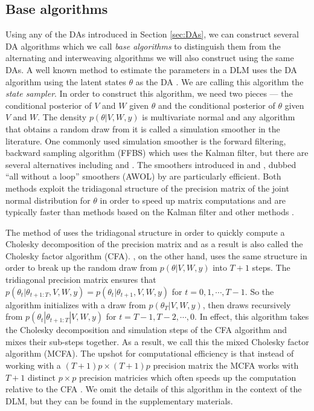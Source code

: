 \documentclass{article}
\begin{document}
\subsection{Base algorithms}\label{sec:Algs:base}
Using any of the DAs introduced in Section \ref{sec:DAs}, we can construct several DA algorithms which we call {\it base algorithms} to distinguish them from the alternating and interweaving algorithms we will also construct using the same DAs. A well known method to estimate the parameters in a DLM uses the DA algorithm using the latent states $\theta$ as the DA \cite{fruhwirth1994data,carter1994gibbs}. We are calling this algorithm the {\it state sampler}. In order to construct this algorithm, we need two pieces --- the conditional posterior of $V$ and $W$ given $\theta$ and the conditional posterior of $\theta$ given $V$ and $W$. The density $p(\theta|V,W,y)$ is multivariate normal and any algorithm that obtains a random draw from it is called a simulation smoother in the literature. One commonly used simulation smoother is the forward filtering, backward sampling algorithm (FFBS) \cite{fruhwirth1994data,carter1994gibbs} which uses the Kalman filter, but there are several alternatives including  and . The smoothers introduced in  and , dubbed ``all without a loop'' smoothers (AWOL) by  are particularly efficient. Both methods exploit the tridiagonal structure of the precision matrix of the joint normal distribution for $\theta$ in order to speed up matrix computations and are typically faster than methods based on the Kalman filter and other methods \cite{mccausland2011simulation}.

The method of  uses the tridiagonal structure in order to quickly compute a Cholesky decomposition of the precision matrix and as a result is also called the Cholesky factor algorithm (CFA). , on the other hand, uses the same structure in order to break up the random draw from $p(\theta|V,W,y)$ into $T+1$ steps. The tridiagonal precision matrix ensures that $p(\theta_{t}|\theta_{t+1:T},V,W,y) = p(\theta_{t}|\theta_{t+1},V,W,y)$ for $t=0,1,\cdots,T-1$. So the algorithm initializes with a draw from $p(\theta_T|V,W,y)$, then draws recursively from $p(\theta_{t}|\theta_{t+1:T}|V,W,y)$ for $t=T-1,T-2,\cdots,0$. In effect, this algorithm takes the Cholesky decomposition and simulation steps of the CFA algorithm and mixes their sub-steps together.  As a result, we call this the mixed Cholesky factor algorithm (MCFA). The upshot for computational efficiency is that instead of working with a $(T+1)p\times (T+1)p$ precision matrix the MCFA works with $T+1$ distinct $p\times p$ precision matricies which often speeds up the computation relative to the CFA \cite{mccausland2011simulation}. We omit the details of this algorithm in the context of the DLM, but they can be found in the supplementary materials.
\end{document}
